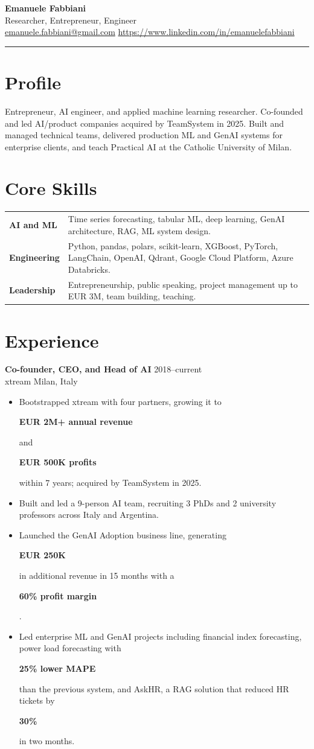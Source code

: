 \documentclass[10pt,a4paper]{article}
\newcommand{\entry}[4]{%
  \textbf{#1} \hfill #2\\
  {\color{textgray}#3 \hfill #4}\par
}
\newcommand{\metric}[1]{\colorbox{softaccent}{\strut\textbf{#1}}}
\begin{document}
{\LARGE\bfseries Emanuele Fabbiani}\\[1pt]
{\normalsize Researcher, Entrepreneur, Engineer}\\[3pt]
\href{mailto:emanuele.fabbiani@gmail.com}{emanuele.fabbiani@gmail.com} \quad
\href{https://www.linkedin.com/in/emanuelefabbiani}{https://www.linkedin.com/in/emanuelefabbiani}

\vspace{3pt}
{\color{accent}\rule{\textwidth}{2pt}}

\section*{Profile}
Entrepreneur, AI engineer, and applied machine learning researcher. Co-founded and led AI/product companies acquired by TeamSystem in 2025. Built and managed technical teams, delivered production ML and GenAI systems for enterprise clients, and teach Practical AI at the Catholic University of Milan.

\section*{Core Skills}
\begin{tabularx}{\textwidth}{>{\bfseries}p{2.3cm}X}
AI and ML & Time series forecasting, tabular ML, deep learning, GenAI architecture, RAG, ML system design.\\
Engineering & Python, pandas, polars, scikit-learn, XGBoost, PyTorch, LangChain, OpenAI, Qdrant, Google Cloud Platform, Azure Databricks.\\
Leadership & Entrepreneurship, public speaking, project management up to EUR 3M, team building, teaching.
\end{tabularx}

\section*{Experience}
\entry{Co-founder, CEO, and Head of AI}{2018--current}{xtream}{Milan, Italy}
\begin{itemize}
  \item Bootstrapped xtream with four partners, growing it to \metric{EUR 2M+ annual revenue} and \metric{EUR 500K profits} within 7 years; acquired by TeamSystem in 2025.
  \item Built and led a 9-person AI team, recruiting 3 PhDs and 2 university professors across Italy and Argentina.
  \item Launched the GenAI Adoption business line, generating \metric{EUR 250K} in additional revenue in 15 months with a \metric{60\% profit margin}.
  \item Led enterprise ML and GenAI projects including financial index forecasting, power load forecasting with \metric{25\% lower MAPE} than the previous system, and AskHR, a RAG solution that reduced HR tickets by \metric{30\%} in two months.
\end{itemize}
\end{document}
